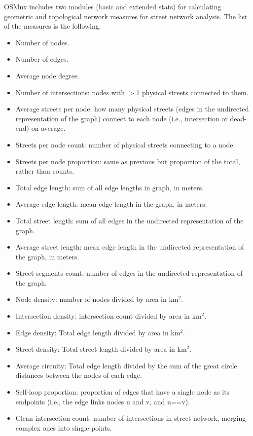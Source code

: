 OSMnx includes two modules (basic and extended stats) for calculating geometric and topological network measures for street network analysis. The list of the measures is the following:

\begin{itemize}
	\item Number of nodes.
	\item Number of edges.
	\item Average node degree.
	\item Number of intersections: nodes with $>$1 physical streets connected to them.
	\item Average streets per node: how many physical streets (edges in the undirected representation of the graph) connect to each node (i.e., intersection or dead-end) on average.
	\item Streets per node count: number of physical streets connecting to a node.
	\item Streets per node proportion: same as previous but proportion of the total, rather than counts.
	\item Total edge length: sum of all edge lengths in graph, in meters.
	\item Average edge length: mean edge length in the graph, in meters.
	\item Total street length: sum of all edges in the undirected representation of the graph.
	\item Average street length: mean edge length in the undirected representation of the graph, in meters.
	\item Street segments count: number of edges in the undirected representation of the graph.
	\item Node density: number of nodes divided by area in km$^2$.
	\item Intersection density: intersection count divided by area in km$^2$.
	\item Edge density: Total edge length divided by area in km$^2$.
	\item Street density: Total street length divided by area in km$^2$.
	\item Average circuity: Total edge length divided by the sum of the great circle distances between the nodes of each edge.
	\item Self-loop proportion: proportion of edges that have a single node as its endpoints (i.e., the edge links nodes u and v, and u==v).
	\item Clean intersection count: number of intersections in street network, merging complex ones into single points.

\end{itemize}
